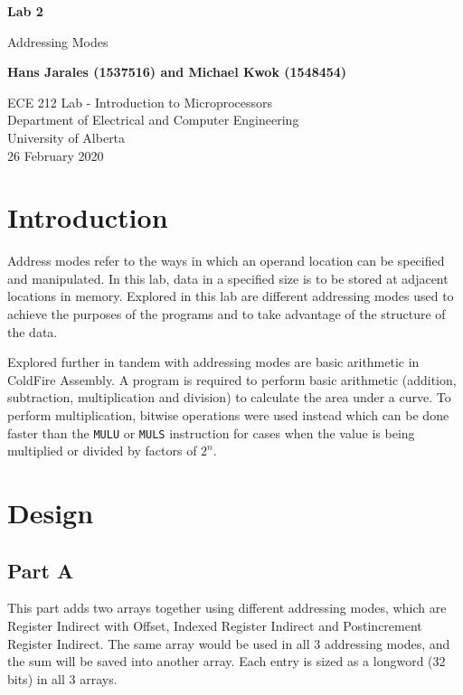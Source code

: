 \documentclass[12pt]{article}
\begin{document}
\begin{titlepage}
    \begin{center}
    \vspace*{1cm}
    
    \textbf{Lab 2}

    \vspace{0.5cm}

    Addressing Modes            
    \vspace{1.5cm}

    \textbf{Hans Jarales (1537516) and Michael Kwok (1548454)}

    \vfill
            
    ECE 212 Lab - Introduction to Microprocessors\\
    Department of Electrical and Computer Engineering\\
    University of Alberta\\
    26 February 2020

   \end{center}
\end{titlepage}

\tableofcontents
\pagebreak

\section{Introduction}
    Address modes refer to the ways in which an operand location can be specified and manipulated. In this lab, data in a specified size is to be stored at adjacent locations in memory. Explored in this lab are different addressing modes used to achieve the purposes of the programs and to take advantage of the structure of the data.
    
    Explored further in tandem with addressing modes are basic arithmetic in ColdFire Assembly. A program is required to perform basic arithmetic (addition, subtraction, multiplication and division) to calculate the area under a curve. To perform multiplication, bitwise operations were used instead which can be done faster than the \Verb#MULU# or \Verb#MULS# instruction for cases when the value is being multiplied or divided by factors of $2^n$.

\section{Design}
\subsection{Part A}
    This part adds two arrays together using different addressing modes, which are Register Indirect with Offset, Indexed Register Indirect and Postincrement Register Indirect. The same array would be used in all 3 addressing modes, and the sum will be saved into another array. Each entry is sized as a longword (32 bits) in all 3 arrays.
\end{document}
